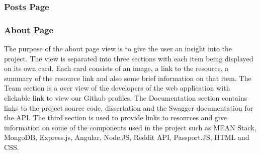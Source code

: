 \subsubsection{Posts Page}
\subsubsection{About Page}
The purpose of the about page view is to give the user an insight into the project. The view is separated into three sections with each item being displayed on its own card. Each card consists of an image, a link to the resource, a summary of the resource link and also some brief information on that item. The Team section is a over view of the developers of the web application with clickable link to view our Github profiles. The Documentation section contains links to the project source code, dissertation and the Swagger documentation for the API. The third section is used to provide links to resources and give information on some of the components used in the project such as  MEAN Stack, MongoDB, Express.js, Angular, Node.JS, Reddit API, Passport.JS, HTML and CSS.
